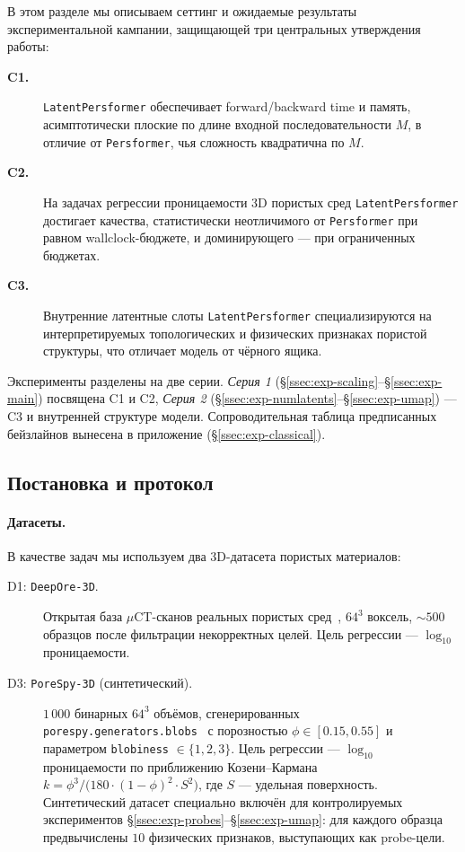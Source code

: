 В этом разделе мы описываем сеттинг и ожидаемые результаты экспериментальной кампании, защищающей три центральных утверждения работы:
\begin{description}
    \item[\textbf{C1.}] \texttt{LatentPersformer} обеспечивает forward/backward time и память, асимптотически плоские по длине входной последовательности $M$, в отличие от \texttt{Persformer}, чья сложность квадратична по $M$.
    \item[\textbf{C2.}] На задачах регрессии проницаемости 3D пористых сред \texttt{LatentPersformer} достигает качества, статистически неотличимого от \texttt{Persformer} при равном wallclock-бюджете, и доминирующего --- при ограниченных бюджетах.
    \item[\textbf{C3.}] Внутренние латентные слоты \texttt{LatentPersformer} специализируются на интерпретируемых топологических и физических признаках пористой структуры, что отличает модель от чёрного ящика.
\end{description}

Эксперименты разделены на две серии. \emph{Серия 1} (§\ref{ssec:exp-scaling}--§\ref{ssec:exp-main}) посвящена C1 и C2, \emph{Серия 2} (§\ref{ssec:exp-numlatents}--§\ref{ssec:exp-umap}) --- C3 и внутренней структуре модели. Сопроводительная таблица предписанных бейзлайнов вынесена в приложение (§\ref{ssec:exp-classical}).

\subsection{Постановка и протокол}
\label{ssec:exp-setup}

\paragraph{Датасеты.} В качестве задач мы используем два 3D-датасета пористых материалов:
\begin{description}
    \item[D1: \texttt{DeepOre-3D}.] Открытая база $\mu$CT-сканов реальных пористых сред~\cite{deepore-zenodo}, $64^3$ воксель, $\sim 500$ образцов после фильтрации некорректных целей. Цель регрессии --- $\log_{10}$ проницаемости.
    \item[D3: \texttt{PoreSpy-3D} (синтетический).] $1\,000$ бинарных $64^3$ объёмов, сгенерированных \texttt{porespy.generators.blobs}~\cite{porespy} с порозностью $\phi \in [0.15, 0.55]$ и параметром \texttt{blobiness} $\in \{1, 2, 3\}$. Цель регрессии --- $\log_{10}$ проницаемости по приближению Козени--Кармана $k = \phi^3 / \bigl(180 \cdot (1-\phi)^2 \cdot S^2\bigr)$, где $S$ --- удельная поверхность. Синтетический датасет специально включён для контролируемых экспериментов §\ref{ssec:exp-probes}--§\ref{ssec:exp-umap}: для каждого образца предвычислены $10$ физических признаков, выступающих как probe-цели.
\end{description}

